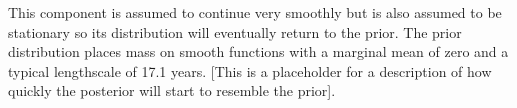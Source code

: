 This component is assumed to continue very smoothly but is also assumed to be stationary so its distribution will eventually return to the prior.
The prior distribution places mass on smooth functions with a marginal mean of zero and a typical lengthscale of 17.1 years.
[This is a placeholder for a description of how quickly the posterior will start to resemble the prior].